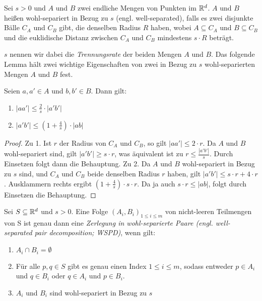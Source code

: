 \begin{definition}
    	\label{def:wellsep}
    	Sei $s > 0$ und $A$ und $B$ zwei endliche Mengen von Punkten im $\mathbb{R}^d$. $A$ und $B$ heißen wohl-separiert in Bezug zu $s$ (engl. well-separated), falls es zwei disjunkte Bälle $C_A$ und $C_B$ gibt, die denselben Radius $R$ haben, wobei $A \subseteq C_A$ und $B \subseteq C_B$ und die euklidische Distanz zwischen $C_A$ und $C_B$ mindestens $s\cdot R$ beträgt.
    \end{definition}
    
    $s$ nennen wir dabei die \emph{Trennungsrate} der beiden Mengen $A$ und $B$.
    Das folgende Lemma hält zwei wichtige Eigenschaften von zwei in Bezug zu $s$ wohl-separierten Mengen $A$ und $B$ fest.
    \begin{lemma}
    	\label{lem:wellsep}
		Seien $a, a' \in A$ und $b, b' \in B$. Dann gilt:
		\begin{enumerate}
			\item $\displaystyle |aa'| \leq \frac{2}{s}\cdot|a'b'|$
			\item $\displaystyle |a'b'| \leq (1+\frac{4}{s})\cdot|ab|$
		\end{enumerate}
    \end{lemma}
    \begin{proof}
    	Zu 1. Ist $r$ der Radius von $C_A$ und $C_B$, so gilt $|aa'| \leq 2 \cdot r$. Da $A$ und $B$ wohl-separiert sind, gilt $|a'b'| \geq s \cdot r$, was äquivalent ist zu $r \leq \frac{|a'b'|}{s}$. Durch Einsetzen folgt dann die Behauptung.
    	Zu 2. Da $A$ und $B$ wohl-separiert in Bezug zu $s$ sind, und $C_A$ und $C_B$ beide denselben Radius $r$ haben, gilt $|a'b'| \leq s \cdot r + 4 \cdot r$. Ausklammern rechts ergibt $(1 + \frac{4}{s}) \cdot s \cdot r$. Da ja auch $s \cdot r \leq |ab|$, folgt durch Einsetzen die Behauptung.
    \end{proof}
    
    \begin{definition}
    	\label{def:wspd}
    	Sei $S \subseteq \mathbb{R}^d$ und $s > 0$. Eine Folge $(A_i, B_i)_{1 \leq i \leq m}$ von nicht-leeren Teilmengen von S ist genau dann eine \emph{Zerlegung in wohl-separierte Paare (engl. well-separated pair decomposition; WSPD)}, wenn gilt:
    	\begin{enumerate}[label={(\arabic*)}, itemsep=0mm]
    		\item $A_i \cap B_i = \emptyset$
    		\item Für alle $p, q \in S$ gibt es genau einen Index $1 \leq i \leq m$, sodass entweder $p \in A_i$ und $q \in B_i$ oder $q \in A_i$ und $p \in B_i$.
    		\item $A_i$ und $B_i$ sind wohl-separiert in Bezug zu $s$
    	\end{enumerate}
    \end{definition}
	
